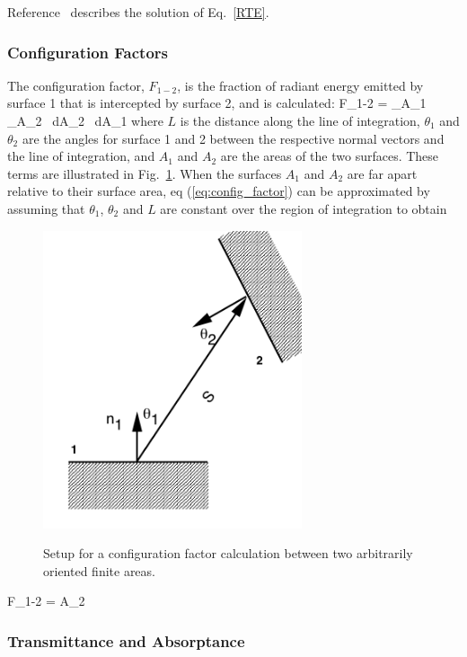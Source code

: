 Reference~\cite{Forney_radiation} describes the solution of Eq.~\ref{RTE}.


\subsubsection{Configuration Factors}

The configuration factor, $F_{1-2}$, is the fraction of radiant energy emitted by surface 1 that is intercepted by  surface 2, and is calculated:
\be
   F_{1-2} =  \int_{A_1} \int_{A_2}  \, dA_2 \, dA_1 \label{eq:config_factor}
\ee
where $L$ is the distance along the line of integration,  $\theta_1$ and $\theta_2$ are the angles for surface 1 and 2 between the respective normal vectors and the line of integration, and $A_1$ and $A_2$ are the areas of the two surfaces.  These terms are illustrated in Fig.~\ref{fig:Rad_Config_Factor}.  When the surfaces $A_1$ and $A_2$ are far apart relative to their surface area, eq (\ref{eq:config_factor}) can be approximated by assuming that $\theta_1$, $\theta_2$ and $L$ are constant over the region of integration to obtain
\begin{figure}
\begin{center}
\includegraphics[width=3.0in]{FIGURES/Theory/Radiation_Config_Factor}\\
\end{center}
\caption{Setup for a configuration factor calculation between two arbitrarily oriented finite areas.}
 \label{fig:Rad_Config_Factor}
\end{figure}
\be
   F_{1-2} =  A_2
\ee

\subsubsection{Transmittance and Absorptance}

